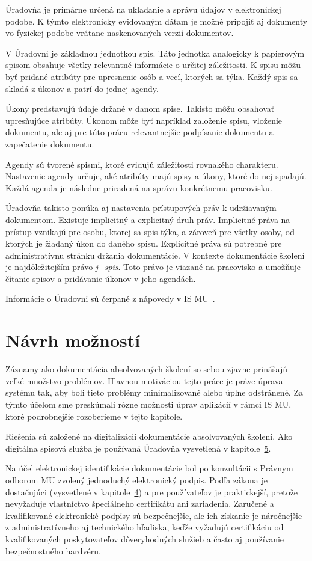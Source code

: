 \documentclass[
  digital,     %
  oneside,     %
  nosansbold,  %
  nocolorbold, %
  lof,         %
  nolot,         %
]{fithesis4}
\begin{document}
Úradovňa je primárne určená na ukladanie a správu údajov v elektronickej podobe. K týmto elektronicky evidovaným dátam je možné pripojiť aj dokumenty vo fyzickej podobe vrátane naskenovaných verzií dokumentov.

V Úradovni je základnou jednotkou spis. Táto jednotka analogicky k papierovým spisom obsahuje všetky relevantné informácie o určitej záležitosti. K spisu môžu byť pridané atribúty pre upresnenie osôb a vecí, ktorých sa týka. Každý spis sa skladá z úkonov a patrí do jednej agendy.

Úkony predstavujú údaje držané v danom spise. Takisto môžu obsahovať upresňujúce atribúty. Úkonom môže byť napríklad založenie spisu, vloženie dokumentu, ale aj pre túto prácu relevantnejšie podpísanie dokumentu a zapečatenie dokumentu.

Agendy sú tvorené spismi, ktoré evidujú záležitosti rovnakého charakteru. Nastavenie agendy určuje, aké atribúty majú spisy a úkony, ktoré do nej spadajú. Každá agenda je následne priradená na správu konkrétnemu pracovisku.

Úradovňa takisto ponúka aj nastavenia prístupových práv k udržiavaným dokumentom. Existuje implicitný a explicitný druh práv. Implicitné práva na prístup vznikajú pre osobu, ktorej sa spis týka, a zároveň pre všetky osoby, od ktorých je žiadaný úkon do daného spisu. Explicitné práva sú potrebné pre administratívnu stránku držania dokumentácie. V kontexte dokumentácie školení je najdôležitejším právo \textit{j\_spis}. Toto právo je viazané na pracovisko a umožňuje čítanie spisov a pridávanie úkonov v jeho agendách.

Informácie o Úradovni sú čerpané z nápovedy v IS MU~\cite{uradovna2024}.

\chapter{Návrh možností}
\label{kap-6}
Záznamy ako dokumentácia absolvovaných školení so sebou zjavne prinášajú veľké množstvo problémov. Hlavnou motiváciou tejto práce je práve úprava systému tak, aby boli tieto problémy minimalizované alebo úplne odstránené. Za týmto účelom sme preskúmali rôzne možnosti úprav aplikácií v rámci IS MU, ktoré podrobnejšie rozoberieme v tejto kapitole.

Riešenia sú založené na digitalizácii dokumentácie absolvovaných školení. Ako digitálna spisová služba je používaná Úradovňa vysvetlená v kapitole~\hyperref[kap-5]{5}.

Na účel elektronickej identifikácie dokumentácie bol po konzultácii s Právnym odborom MU zvolený jednoduchý elektronický podpis. Podľa zákona je dostačujúci (vysvetlené v kapitole~\hyperref[kap-4]{4}) a pre používateľov je praktickejší, pretože nevyžaduje vlastníctvo špeciálneho certifikátu ani zariadenia. Zaručené a kvalifikované elektronické podpisy sú bezpečnejšie, ale ich získanie je náročnejšie z administratívneho aj technického hľadiska, keďže vyžadujú certifikáciu od kvalifikovaných poskytovateľov dôveryhodných služieb a často aj používanie bezpečnostného hardvéru.
\end{document}
